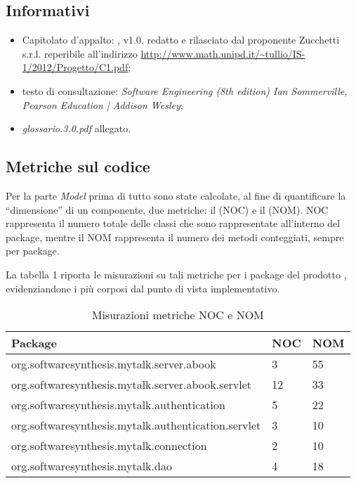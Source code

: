 \subsection{Informativi}
\begin{itemize}
\item[] Capitolato d'appalto: \caName{}, v1.0, redatto e rilasciato dal proponente Zucchetti s.r.l. reperibile all'indirizzo \url{http://www.math.unipd.it/~tullio/IS-1/2012/Progetto/C1.pdf};
\item[] testo di consultazione: \textit{Software Engineering (8th edition) Ian Sommerville, Pearson Education | Addison Wesley};
\item[] \textit{glossario.3.0.pdf} allegato.
\end{itemize}
\clearpage

\subsection{Metriche sul codice}
Per la parte \textit{Model} prima di tutto sono state calcolate, al fine di quantificare la ``dimensione'' di un componente, due metriche: il  (NOC) e il  (NOM).
NOC rappresenta il numero totale delle classi che sono rappresentate all'interno del package, mentre il NOM rappresenta il numero dei metodi conteggiati, sempre per package.

La tabella 1 riporta le misurazioni su tali metriche per i package del prodotto \caName{}, evidenziandone i più corposi dal punto di vista implementativo.

\setcounter{table}{0}

\begin{table}[H]
\centering
{}
\begin{tabular}{p{}ll}
\toprule
Package & NOC  & NOM\\
\midrule
org.softwaresynthesis.mytalk.server.abook & 3 & 55\\
org.softwaresynthesis.mytalk.server.abook.servlet & 12 & 33\\
org.softwaresynthesis.mytalk.authentication & 5 & 22\\
org.softwaresynthesis.mytalk.authentication.servlet & 3 & 10\\
org.softwaresynthesis.mytalk.connection & 2 & 10\\
org.softwaresynthesis.mytalk.dao & 4 & 18\\
\bottomrule
\end{tabular}
\caption{Misurazioni metriche NOC e NOM} \label{tab:metricheNOCNOM}
\end{table}

